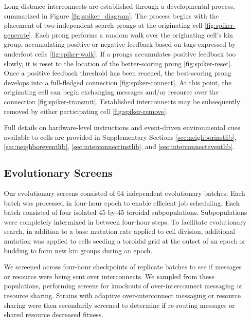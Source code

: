 Long-distance interconnects are established through a developmental process, summarized in Figure \ref{fig:spiker_diagram}.
The process begins with the placement of two independent search prongs at the originating cell \ref{fig:spiker-generate}.
Each prong performs a random walk over the originating cell's kin group, accumulating positive or negative feedback based on tags expressed by underfoot cells \ref{fig:spiker-walk}.
If a prongs accumulates positive feedback too slowly, it is reset to the location of the better-scoring prong \ref{fig:spiker-reset}.
Once a positive feedback threshold has been reached, the best-scoring prong develops into a full-fledged connection \ref{fig:spiker-connect}.
At this point, the originating cell can begin exchanging messages and/or resource over the connection \ref{fig:spiker-transmit}.
Established interconnects may be subsequently removed by either participating cell \ref{fig:spiker-remove}.

Full details on hardware-level instructions and event-driven environmental cues available to cells are provided in Supplementary Sections \ref{sec:neighborinstlib}, \ref{sec:neighboreventlib}, \ref{sec:interconnectinstlib}, and \ref{sec:interconnecteventlib}.





\subsection{Evolutionary Screens}

Our evolutionary screens consisted of 64 independent evolutionary batches.
Each batch was processed in four-hour epoch to enable efficient job scheduling.
Each batch consisted of four isolated 45-by-45 toroidal subpopulations.
Subpopulations were completely intermixed in between four-hour steps.
To facilitate evolutionary search, in addition to a base mutation rate applied to cell division, additional mutation was applied to cells seeding a toroidal grid at the outset of an epoch or budding to form new kin groups during an epoch.

We screened across four-hour checkpoints of replicate batches to see if messages or resource were being sent over interconnects.
We sampled from these populations, performing screens for knockouts of over-interconnect messaging or resource sharing.
Strains with adaptive over-interconnect messaging or resource sharing were then secondarily screened to determine if re-routing messages or shared resource decreased fitness.

